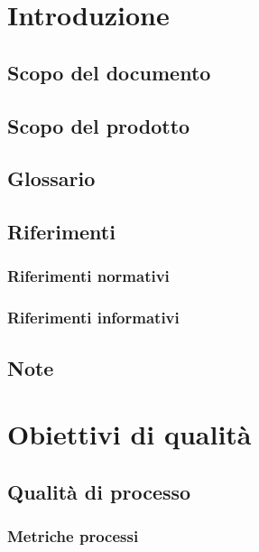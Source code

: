 \documentclass[a4paper, oneside, openany, dvipsnames, table]{article}
\begin{document}
\copertina{}

\newpage
\tableofcontents
\newpage
\listoffigures
\newpage
\listoftables
\newpage
\section{Introduzione}
	\subsection{Scopo del documento}
		
	\subsection{Scopo del prodotto}
		
	\subsection{Glossario}
		
	\subsection{Riferimenti}
		\subsubsection{Riferimenti normativi}
			
		\subsubsection{Riferimenti informativi}
			
	\subsection{Note}
			
	\newpage
	

\section{Obiettivi di qualità}
\label{sec:metriche}
	
	\subsection{Qualità di processo}
	
		\subsubsection{Metriche processi}
		
\end{document}
